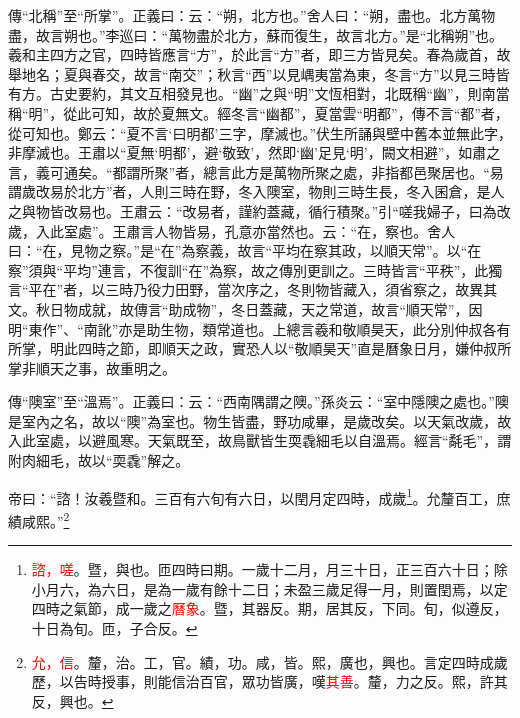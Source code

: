 {\noindent\zhuan{}\fzbyks 傳“北稱”至“所掌”。正義曰：云：“朔，北方也。”舍人曰：“朔，盡也。北方萬物盡，故言朔也。”李巡曰：“萬物盡於北方，蘇而復生，故言北方。”是“北稱朔”也。羲和主四方之官，四時皆應言“方”，於此言“方”者，即三方皆見矣。春為歲首，故舉地名；夏與春交，故言“南交”；秋言“西”以見嵎夷當為東，冬言“方”以見三時皆有方。古史要約，其文互相發見也。“幽”之與“明”文恆相對，北既稱“幽”，則南當稱“明”，從此可知，故於夏無文。經冬言“幽都”，夏當雲“明都”，傳不言“都”者，從可知也。鄭云：“夏不言‘曰明都’三字，摩滅也。”伏生所誦與壁中舊本並無此字，非摩滅也。王肅以“夏無‘明都’，避‘敬致’，然即‘幽’足見‘明’，闕文相避”，如肅之言，義可通矣。“都謂所聚”者，總言此方是萬物所聚之處，非指都邑聚居也。“易謂歲改易於北方”者，人則三時在野，冬入隩室，物則三時生長，冬入囷倉，是人之與物皆改易也。王肅云：“改易者，謹約蓋藏，循行積聚。”引“嗟我婦子，曰為改歲，入此室處”。王肅言人物皆易，孔意亦當然也。云：“在，察也。舍人曰：“在，見物之察。”是“在”為察義，故言“平均在察其政，以順天常”。以“在察”須與“平均”連言，不復訓“在”為察，故之傳別更訓之。三時皆言“平秩”，此獨言“平在”者，以三時乃役力田野，當次序之，冬則物皆藏入，須省察之，故異其文。秋日物成就，故傳言“助成物”，冬日蓋藏，天之常道，故言“順天常”，因明“東作”、“南訛”亦是助生物，類常道也。上總言羲和敬順昊天，此分別仲叔各有所掌，明此四時之節，即順天之政，實恐人以“敬順昊天”直是曆象日月，嫌仲叔所掌非順天之事，故重明之。 \par}

{\noindent\zhuan{}\fzbyks 傳“隩室”至“溫焉”。正義曰：云：“西南隅謂之隩。”孫炎云：“室中隱隩之處也。”隩是室內之名，故以“隩”為室也。物生皆盡，野功咸畢，是歲改矣。以天氣改歲，故入此室處，以避風寒。天氣既至，故鳥獸皆生耎毳細毛以自溫焉。經言“氄毛”，謂附肉細毛，故以“耎毳”解之。 \par}

帝曰：“諮！汝羲暨和。三百有六旬有六日，以閏月定四時，成歲\footnote{\textcolor{red}{諮，嗟}。暨，與也。匝四時曰期。一歲十二月，月三十日，正三百六十日；除小月六，為六日，是為一歲有餘十二日；未盈三歲足得一月，則置閏焉，以定四時之氣節，成一歲之\textcolor{red}{曆象}。暨，其器反。期，居其反，下同。旬，似遵反，十日為旬。匝，子合反。}。允釐百工，庶績咸熙。”\footnote{\textcolor{red}{允，信}。釐，治。工，官。績，功。咸，皆。熙，廣也，興也。言定四時成歲歷，以告時授事，則能信治百官，眾功皆廣，嘆\textcolor{red}{其善}。釐，力之反。熙，許其反，興也。}

